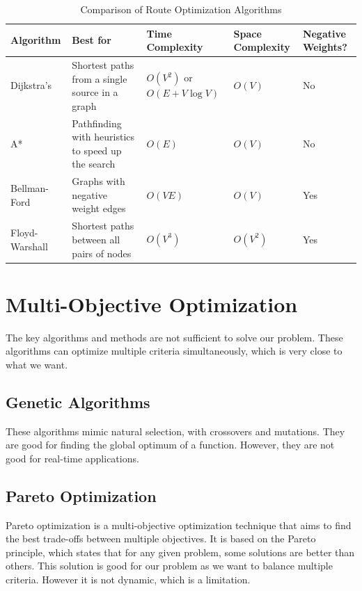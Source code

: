 \documentclass[conference]{IEEEtran}
\begin{document}
    \begin{table}[h]
        \centering
        \begin{tabularx}{\textwidth}{|X|X|X|X|X|}
            \hline
            \textbf{Algorithm} & \textbf{Best for}                                  & \textbf{Time Complexity}          & \textbf{Space Complexity} & \textbf{Negative Weights?} \\ \hline
            Dijkstra’s         & Shortest paths from a single source in a graph     & \(O(V^2)\) or \(O(E + V \log V)\) & \(O(V)\)                  & No                         \\ \hline
            A*                 & Pathfinding with heuristics to speed up the search & \(O(E)\)                          & \(O(V)\)                  & No                         \\ \hline
            Bellman-Ford       & Graphs with negative weight edges                  & \(O(VE)\)                         & \(O(V)\)                  & Yes                        \\ \hline
            Floyd-Warshall     & Shortest paths between all pairs of nodes          & \(O(V^3)\)                        & \(O(V^2)\)                & Yes                        \\ \hline
        \end{tabularx}
        \caption{Comparison of Route Optimization Algorithms}
        \label{tab:route_optimization_algorithms}
    \end{table}


    \section{Multi-Objective Optimization}\label{sec:multi-objective-optimization}
    The key algorithms and methods are not sufficient to solve our problem.
    These algorithms can optimize multiple criteria simultaneously, which is very close to what we want.

    \subsection{Genetic Algorithms}\label{subsec:genetic-algorithms}
    These algorithms mimic natural selection, with crossovers and mutations.
    They are good for finding the global optimum of a function.
    However, they are not good for real-time applications.

    \subsection{Pareto Optimization}\label{subsec:pareto-optimization}
    Pareto optimization is a multi-objective optimization technique that aims to find the best trade-offs between multiple objectives.
    It is based on the Pareto principle, which states that for any given problem, some solutions are better than others.
    This solution is good for our problem as we want to balance multiple criteria.
    However it is not dynamic, which is a limitation.
\end{document}
